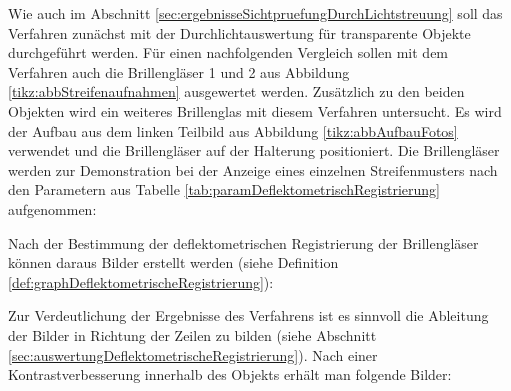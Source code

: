 Wie auch im Abschnitt \ref{sec:ergebnisseSichtpruefungDurchLichtstreuung} soll das Verfahren zunächst mit der Durchlichtauswertung für transparente Objekte durchgeführt werden.
Für einen nachfolgenden Vergleich sollen mit dem Verfahren auch die Brillengläser 1 und 2 aus Abbildung \ref{tikz:abbStreifenaufnahmen} ausgewertet werden.
Zusätzlich zu den beiden Objekten wird ein weiteres Brillenglas mit diesem Verfahren untersucht.
Es wird der Aufbau aus dem linken Teilbild aus Abbildung \ref{tikz:abbAufbauFotos} verwendet und die Brillengläser auf der Halterung positioniert.
Die Brillengläser werden zur Demonstration bei der Anzeige eines einzelnen Streifenmusters nach den Parametern aus Tabelle \ref{tab:paramDeflektometrischRegistrierung} aufgenommen:

{
	\begin{figure}[H]
		\centering
		
		\label{tikz:abbSinusStreifenaufnahmen}
	\end{figure}
}

\noindent
Nach der Bestimmung der deflektometrischen Registrierung der Brillengläser können daraus Bilder erstellt werden (siehe Definition \ref{def:graphDeflektometrischeRegistrierung}):

{
	\begin{figure}[H]
		\centering
		
		\label{tikz:abbDeflectometricRegistrations}
	\end{figure}
}

\noindent
Zur Verdeutlichung der Ergebnisse des Verfahrens ist es sinnvoll die Ableitung der Bilder in Richtung der Zeilen zu bilden (siehe Abschnitt \ref{sec:auswertungDeflektometrischeRegistrierung}).
Nach einer Kontrastverbesserung innerhalb des Objekts erhält man folgende Bilder:

{
	\begin{figure}[H]
		\centering
		
		\label{tikz:abbAbleitungRegistrierungDurchlicht}
	\end{figure}
}

